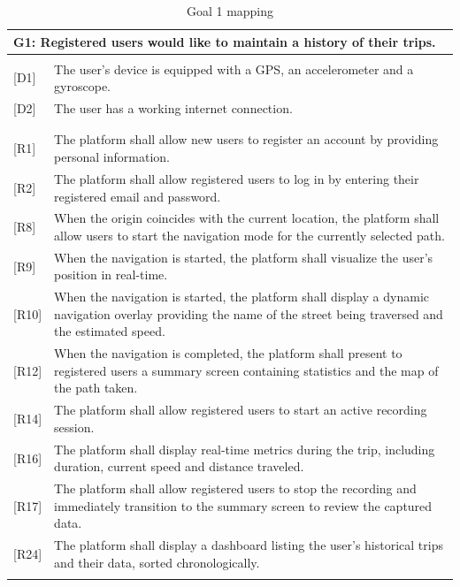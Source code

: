         
\begin{table}[H]
    \centering
    \renewcommand{\arraystretch}{1.5}
    
    \begin{tabularx}{\textwidth}{|l X|}
        \hline
        \multicolumn{2}{|l|}{\textbf{G1}: Registered users would like to maintain a history of their trips.} \\
        \hline
        & \\[-1em] %
        
        {[D1]} & The user’s device is equipped with a GPS, an accelerometer and a gyroscope. \\
        {[D2]} & The user has a working internet connection. \\
        & \\
        \hline
        & \\[-1em]
        
        {[R1]} & The platform shall allow new users to register an account by providing personal information. \\
        {[R2]} & The platform shall allow registered users to log in by entering their registered email and password. \\
        {[R8]} & When the origin coincides with the current location, the platform shall allow users to start the navigation mode for the currently selected path. \\
        {[R9]} & When the navigation is started, the platform shall visualize the user’s position in real-time.\\
        {[R10]} & When the navigation is started, the platform shall display a dynamic navigation overlay providing the name of the street being traversed and the estimated speed.\\
        {[R12]} & When the navigation is completed, the platform shall present to registered users a summary screen containing statistics and the map of the path taken. \\
        {[R14]} & The platform shall allow registered users to start an active recording session. \\
        {[R16]} & The platform shall display real-time metrics during the trip, including duration, current speed and
distance traveled.\\
        {[R17]} & The platform shall allow registered users to stop the recording and immediately transition to the
        summary screen to review the captured data. \\
        {[R24]} & The platform shall display a dashboard listing the user’s historical trips and their data, sorted
        chronologically. \\
        & \\
        \hline
    \end{tabularx}
    \caption{Goal 1 mapping}
\end{table}


